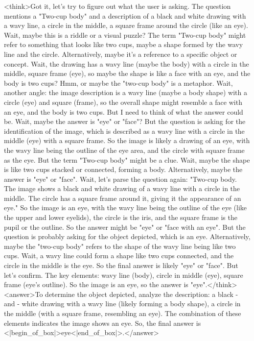 <think>Got it, let's try to figure out what the user is asking. The question mentions a "Two-cup body" and a description of a black and white drawing with a wavy line, a circle in the middle, a square frame around the circle (like an eye). Wait, maybe this is a riddle or a visual puzzle? The term "Two-cup body" might refer to something that looks like two cups, maybe a shape formed by the wavy line and the circle. Alternatively, maybe it's a reference to a specific object or concept. Wait, the drawing has a wavy line (maybe the body) with a circle in the middle, square frame (eye), so maybe the shape is like a face with an eye, and the body is two cups? Hmm, or maybe the "two-cup body" is a metaphor. Wait, another angle: the image description is a wavy line (maybe a body shape) with a circle (eye) and square (frame), so the overall shape might resemble a face with an eye, and the body is two cups. But I need to think of what the answer could be. Wait, maybe the answer is "eye" or "face"? But the question is asking for the identification of the image, which is described as a wavy line with a circle in the middle (eye) with a square frame. So the image is likely a drawing of an eye, with the wavy line being the outline of the eye area, and the circle with square frame as the eye. But the term "Two-cup body" might be a clue. Wait, maybe the shape is like two cups stacked or connected, forming a body. Alternatively, maybe the answer is "eye" or "face". Wait, let's parse the question again: "Two-cup body. The image shows a black and white drawing of a wavy line with a circle in the middle. The circle has a square frame around it, giving it the appearance of an eye." So the image is an eye, with the wavy line being the outline of the eye (like the upper and lower eyelids), the circle is the iris, and the square frame is the pupil or the outline. So the answer might be "eye" or "face with an eye". But the question is probably asking for the object depicted, which is an eye. Alternatively, maybe the "two-cup body" refers to the shape of the wavy line being like two cups. Wait, a wavy line could form a shape like two cups connected, and the circle in the middle is the eye. So the final answer is likely "eye" or "face". But let's confirm. The key elements: wavy line (body), circle in middle (eye), square frame (eye's outline). So the image is an eye, so the answer is "eye".</think><answer>To determine the object depicted, analyze the description: a black - and - white drawing with a wavy line (likely forming a body shape), a circle in the middle (with a square frame, resembling an eye). The combination of these elements indicates the image shows an eye.  
So, the final answer is <|begin_of_box|>eye<|end_of_box|>.</answer>
